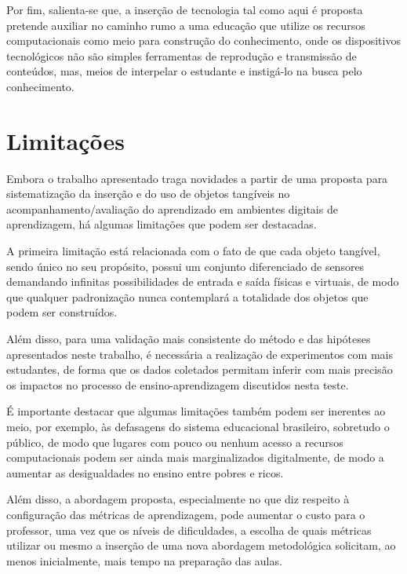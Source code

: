 Por fim, salienta-se que,
a inserção de tecnologia tal como aqui é proposta pretende auxiliar no caminho rumo a uma educação que utilize os recursos computacionais como meio para construção do conhecimento,%
 onde os dispositivos tecnológicos não são simples ferramentas de reprodução e transmissão de conteúdos, mas, meios de interpelar o estudante e instigá-lo na busca pelo conhecimento.

\section{Limitações}

Embora o trabalho apresentado traga novidades a partir de uma proposta para sistematização da inserção e do uso de objetos tangíveis no acompanhamento/avaliação do aprendizado em ambientes digitais de aprendizagem, há algumas limitações que podem ser destacadas.

A primeira limitação está relacionada com o fato de que cada objeto tangível, sendo único no seu propósito, possui um conjunto diferenciado de sensores demandando infinitas possibilidades de entrada e saída físicas e virtuais, de modo que qualquer padronização nunca contemplará a totalidade dos objetos que podem ser construídos.

Além disso, para uma validação mais consistente do método e das hipóteses apresentados neste trabalho, é necessária a realização de experimentos com mais estudantes, de forma que os dados coletados permitam inferir com mais precisão os impactos no processo de ensino-aprendizagem discutidos nesta teste.

É importante destacar que algumas limitações também podem ser inerentes ao meio, por exemplo, às defasagens do sistema educacional brasileiro, sobretudo o público, de modo que lugares com pouco ou nenhum acesso a recursos computacionais podem ser ainda mais marginalizados digitalmente, de modo a aumentar as desigualdades no ensino entre pobres e ricos. 

Além disso, a abordagem proposta, especialmente no que diz respeito à configuração das métricas de aprendizagem, pode aumentar o custo para o professor, uma vez que os níveis de dificuldades, a escolha de quais métricas utilizar ou mesmo a inserção de uma nova abordagem metodológica solicitam, ao menos inicialmente, mais tempo na preparação das aulas.



